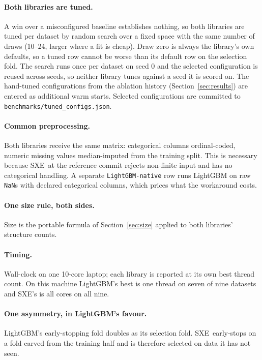 \documentclass[11pt,a4paper]{article}
\newcommand{\code}[1]{\texttt{\small #1}}
\newcommand{\SXE}{\textsc{SXE}}
\theoremstyle{definition}
\begin{document}
\paragraph{Both libraries are tuned.} A win over a misconfigured baseline
establishes nothing, so both libraries are tuned per dataset by random search
over a fixed space with the same number of draws (10--24, larger where a fit is
cheap). Draw zero is always the library's own defaults, so a tuned row cannot
be worse than its default row on the selection fold. The search runs once per
dataset on seed 0 and the selected configuration is reused across seeds, so
neither library tunes against a seed it is scored on. The hand-tuned
configurations from the ablation history (Section~\ref{sec:results}) are entered
as additional warm starts. Selected configurations are committed to
\code{benchmarks/tuned\_configs.json}.

\paragraph{Common preprocessing.} Both libraries receive the same matrix:
categorical columns ordinal-coded, numeric missing values median-imputed from
the training split. This is necessary because \SXE\ at the reference commit
rejects non-finite input and has no categorical handling. A separate
\code{LightGBM-native} row runs LightGBM on raw \code{NaN}s with declared
categorical columns, which prices what the workaround costs.

\paragraph{One size rule, both sides.} Size is the portable formula of
Section~\ref{sec:size} applied to both libraries' structure counts.

\paragraph{Timing.} Wall-clock on one 10-core laptop; each library is reported
at its own best thread count. On this machine LightGBM's best is one thread on
seven of nine datasets and \SXE's is all cores on all nine.

\paragraph{One asymmetry, in LightGBM's favour.} LightGBM's early-stopping fold
doubles as its selection fold. \SXE\ early-stops on a fold carved from the
training half and is therefore selected on data it has not seen.
\end{document}
